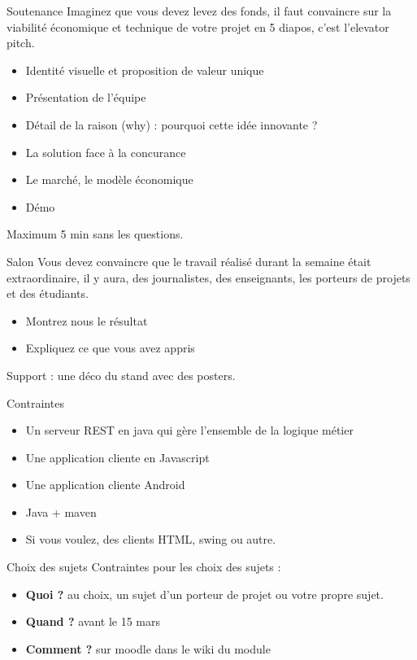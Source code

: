 \documentclass{beamer}
\begin{document}
\begin{frame}{Soutenance}
  Imaginez que vous devez levez des fonds, il faut convaincre sur la viabilité économique et technique de votre projet en 5 diapos, c'est l'elevator pitch.
  \begin{itemize}
    \item Identité visuelle et proposition de valeur unique
    \item Présentation de l'équipe
    \item Détail de la raison (why) : pourquoi cette idée innovante ?
    \item La solution face à la concurance 
    \item Le marché, le modèle économique
    \item Démo
  \end{itemize}

  Maximum 5 min sans les questions.
\end{frame}

\begin{frame}{Salon}
  Vous devez convaincre que le travail réalisé durant la semaine était extraordinaire, il y aura, des journalistes, des enseignants, les porteurs de projets et des étudiants.
  \begin{itemize}
    \item Montrez nous le résultat
    \item Expliquez ce que vous avez appris
  \end{itemize}

  Support : une déco du stand avec des posters.

\end{frame}

\begin{frame}{Contraintes}
  \begin{itemize}
    \item Un serveur REST en java qui gère l'ensemble de la logique métier
    \item Une application cliente en Javascript
    \item Une application cliente Android
    \item Java + maven
    \item Si vous voulez, des clients HTML, swing ou autre.
  \end{itemize}
\end{frame}

\begin{frame}{Choix des sujets}
  Contraintes pour les choix des sujets : 
  \begin{itemize}
    \item \textbf{Quoi ?} au choix, un sujet d'un porteur de projet ou votre propre sujet.
    \item \textbf{Quand ?} avant le 15 mars
    \item \textbf{Comment ?} sur moodle dans le wiki du module
  \end{itemize}
\end{frame}
\end{document}
